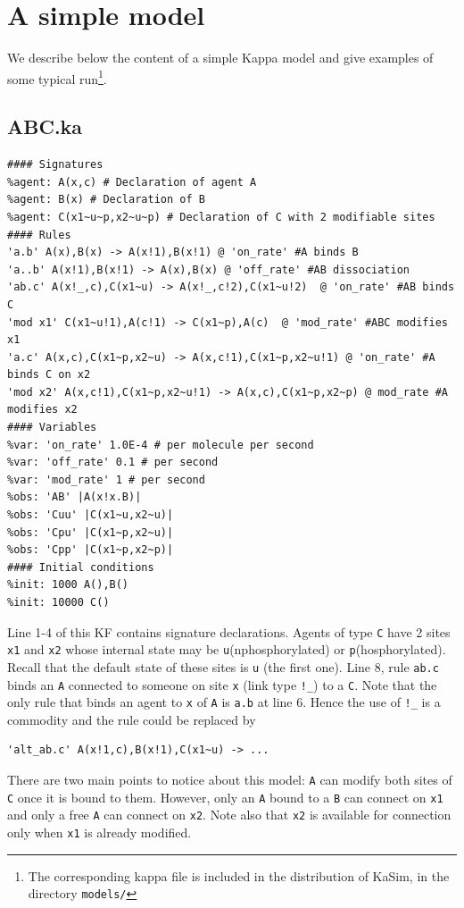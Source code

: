 \documentclass[11pt]{book}
\def\KaSim{\textsf{KaSim}}
\def\ttt#1{\texttt{#1}}
\begin{document}
\chapter{A simple model}\label{chap:abc}

We describe below the content of a simple Kappa model and give examples of some typical run\footnote{The corresponding kappa file is included in the distribution of \KaSim, in the directory \ttt{models/}}.

\section{ABC.ka}
\begin{lstlisting}[language=kappa]
#### Signatures
%agent: A(x,c) # Declaration of agent A
%agent: B(x) # Declaration of B
%agent: C(x1~u~p,x2~u~p) # Declaration of C with 2 modifiable sites
#### Rules
'a.b' A(x),B(x) -> A(x!1),B(x!1) @ 'on_rate' #A binds B
'a..b' A(x!1),B(x!1) -> A(x),B(x) @ 'off_rate' #AB dissociation
'ab.c' A(x!_,c),C(x1~u) -> A(x!_,c!2),C(x1~u!2)  @ 'on_rate' #AB binds C
'mod x1' C(x1~u!1),A(c!1) -> C(x1~p),A(c)  @ 'mod_rate' #ABC modifies x1
'a.c' A(x,c),C(x1~p,x2~u) -> A(x,c!1),C(x1~p,x2~u!1) @ 'on_rate' #A binds C on x2
'mod x2' A(x,c!1),C(x1~p,x2~u!1) -> A(x,c),C(x1~p,x2~p) @ mod_rate #A modifies x2
#### Variables
%var: 'on_rate' 1.0E-4 # per molecule per second
%var: 'off_rate' 0.1 # per second
%var: 'mod_rate' 1 # per second
%obs: 'AB' |A(x!x.B)|
%obs: 'Cuu' |C(x1~u,x2~u)|
%obs: 'Cpu' |C(x1~p,x2~u)|
%obs: 'Cpp' |C(x1~p,x2~p)|
#### Initial conditions
%init: 1000 A(),B()
%init: 10000 C()
\end{lstlisting}

Line 1-4 of this KF contains signature declarations. Agents of type \ttt{C} have 2 sites \ttt{x1} and \ttt{x2} whose internal state may be \ttt{u}(nphosphorylated) or \ttt{p}(hosphorylated). Recall that the default state of these sites is \ttt{u} (the first one). Line 8, rule \ttt{{\textquotesingle}ab.c{\textquotesingle}} binds an \ttt{A} connected to someone on site \ttt{x} (link type \ttt{!\_}) to a \ttt{C}. Note that the only rule that binds an agent to \ttt{x} of \ttt{A} is \ttt{{\textquotesingle}a.b{\textquotesingle}} at line 6. Hence the use of \ttt{!\_} is a commodity and the rule could be replaced by 
\begin{lstlisting}[language=kappa]
'alt_ab.c' A(x!1,c),B(x!1),C(x1~u) -> ...
\end{lstlisting}
There are two main points to notice about this model: \ttt{A} can modify both sites of \ttt{C} once it is bound to them. However, only an \ttt{A} bound to a \ttt{B} can connect on \ttt{x1} and only a free \ttt{A} can connect on \ttt{x2}. Note also that \ttt{x2} is available for connection only when \ttt{x1} is already modified. 
\end{document}
